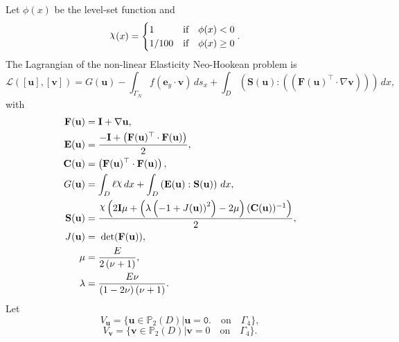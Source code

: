 \documentclass[preview]{standalone}
\let\oldcdot\cdot
\let\cdot\oldcdot
\begin{document}
Let $\phi(x)$ be the level-set function and
 \begin{align*}\raisebox{\depth}{$\chi$}(x) &= \begin{cases} 1 & \mbox{if}\quad \phi(x) < 0 \\ 1/100 & \mbox{if}\quad \phi(x)  \ge 0 \end{cases}.\end{align*}
The Lagrangian of the non-linear Elasticity Neo-Hookean problem is
\begin{dmath*}
\mathcal L(\left[ {\mathbf{ u }}\right],\left[ {\mathbf{ v }}\right]) = G({\mathbf{ u }}) -  \int_{\Gamma_N} f \left( \mathbf e_y \cdot {\mathbf{ v }} \right) \,ds_x +  \int_{D} \left( \mathbf S({\mathbf{ u }}) \mathrel{:} \left( \left(  \mathbf F({\mathbf{ u }})^\top  \cdot  \nabla {\mathbf{ v }}  \right) \right)\right) \,dx , 
\end{dmath*}
with 
\begin{align*}
\mathbf F({\mathbf{ u }}) &= \mathbf{I} +  \nabla {\mathbf{ u }} ,\\
\mathbf E({\mathbf{ u }}) &= \frac{- \mathbf{I} + \left(  \mathbf F({\mathbf{ u }})^\top  \cdot \mathbf F({\mathbf{ u }}) \right)}{2},\\
\mathbf C({\mathbf{ u }}) &= \left(  \mathbf F({\mathbf{ u }})^\top  \cdot \mathbf F({\mathbf{ u }}) \right),\\
G({\mathbf{ u }}) &=  \int_{D} \ell \raisebox{\depth}{$\chi$} \,dx +  \int_{D} \left( \mathbf E({\mathbf{ u }}) \mathrel{:} \mathbf S({\mathbf{ u }}) \right) \,dx,\\
\mathbf S({\mathbf{ u }}) &= \frac{\raisebox{\depth}{$\chi$} \left(2 \mathbf{I} \mu + \left(\lambda \left(-1 + {J({\mathbf{ u }}))}^{2}\right) - 2 \mu\right)  (\mathbf C({\mathbf{ u }}))^{-1} \right)}{2},\\
J({\mathbf{ u }}) &=  \;\operatorname{det}(\mathbf F({\mathbf{ u }})) ,\\
\mu &= \frac{E}{2 \left(\nu + 1\right)},\\
\lambda &= \frac{E \nu}{\left(1 - 2 \nu\right) \left(\nu + 1\right)}.
 \end{align*}
Let
\begin{equation*}
V_{{\mathbf{ u }}} = \{ {\mathbf{ u }} \in \mathbb P_{2}(D)| {\mathbf{ u }} = \mathtt{\text{0.}}  \quad \text{{on}} \quad\Gamma_{4} \},\end{equation*}
\begin{equation*}
V_{{\mathbf{ v }}} = \{ {\mathbf{ v }} \in \mathbb P_{2}(D)| {\mathbf{ v }} = 0  \quad \text{{on}} \quad\Gamma_{4} \}.\end{equation*}
\end{document}
